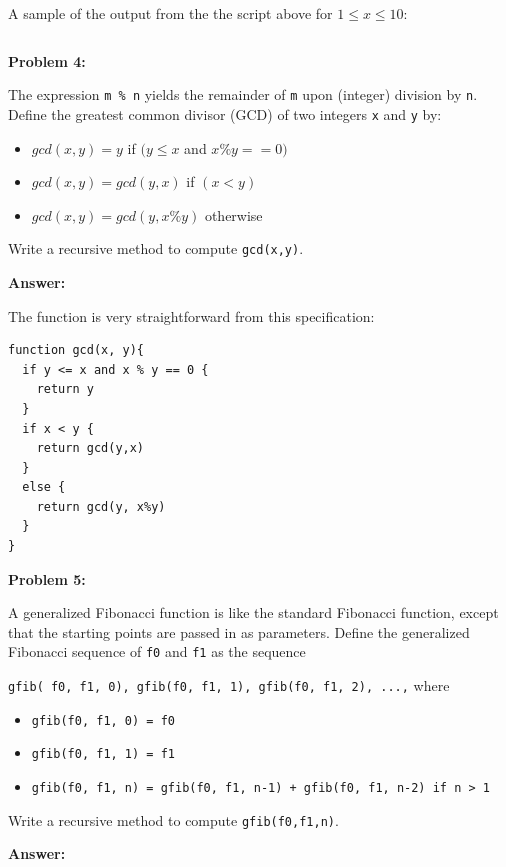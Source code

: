 \documentclass[10pt,letterpaper,final]{report}
\begin{document}
A sample of the output from the the script above for $1 \le x \le 10$:

\inputminted[breaklines=true,fontsize=\footnotesize]{json}{experiment-results.json}
\nocite{OverleafcomCodeHighlightingWithMinted}


\pagebreak
\noindent\textbf{Problem 4:}

The expression \verb|m % n| yields the remainder of \verb|m| upon (integer) division by \verb|n|. Define the greatest common divisor (GCD) of two integers \verb|x| and \verb|y| by:
\begin{itemize}
  \item $gcd(x, y) = y$ if $(y \le x$ and $x\%y == 0)$
  \item $gcd(x, y) = gcd(y, x)$ if $(x < y)$
  \item $gcd(x, y) = gcd(y, x\%y)$ otherwise
\end{itemize}

Write a recursive method to compute \verb|gcd(x,y)|.

\noindent\textbf{Answer:}

The function is very straightforward from this specification:

\begin{mdframed}
\begin{verbatim}
function gcd(x, y){
  if y <= x and x % y == 0 {
    return y
  }
  if x < y {
    return gcd(y,x)
  }  
  else {
    return gcd(y, x%y)
  }
}
\end{verbatim}
\end{mdframed}

\pagebreak
\noindent\textbf{Problem 5:}

A generalized Fibonacci function is like the standard Fibonacci function, except that the starting points are passed in as parameters. Define the generalized Fibonacci sequence of \verb|f0| and \verb|f1| as the sequence

\verb|gfib( f0, f1, 0), gfib(f0, f1, 1), gfib(f0, f1, 2), ...,| where
\begin{itemize}
  \item \verb|gfib(f0, f1, 0) = f0|
  \item \verb|gfib(f0, f1, 1) = f1|
  \item \verb|gfib(f0, f1, n) = gfib(f0, f1, n-1) + gfib(f0, f1, n-2) if n > 1|
\end{itemize}

Write a recursive method to compute \verb|gfib(f0,f1,n)|.

\noindent\textbf{Answer:}
\end{document}

